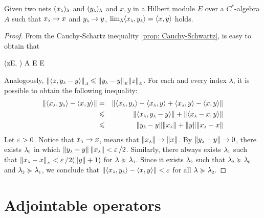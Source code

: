 \begin{lema}
\label{lema: lim <x_lambda,y_lambda> = <x,y>}
Given two nets $(\sub x\lambda)_\lambda$ and $(\sub y\lambda)_\lambda$ and $x,y$ in a Hilbert module $E$ over a $C^*$-algebra $A$ such that $\sub x\lambda \to x$ and $\sub y\lambda \to y$,  $\lim_\lambda \inner{\sub x\lambda}{\sub y\lambda} = \inner xy$ holds.
\begin{proof}
From the Cauchy-Schartz inequality \ref{prop: Cauchy-Schwartz}, is easy to obtain that
\begin{eqspaced*}{(z\in E, \lambda \in \LLambda)}
    A \overset{(\ref{eq: cauchy-schwarts})}\leqslant {}E E
\end{eqspaced*}
Analogously, $\sub{\|\inner z{\sub y\lambda-y}\|}A \leqslant \sub{\|\sub y\lambda-y\|}E \sub{\|z\|}E$. For each and every index $\lambda$, it is possible to obtain the following inequality:
\begin{eqnarray*}
    \|\inner{\sub x\lambda}{\sub y\lambda} - \inner xy\| &=& \|\inner{\sub x\lambda}{\sub y\lambda} - \inner{\sub x\lambda}y + \inner{\sub x\lambda}y- \inner xy\|  \\
    &\leqslant& \|\inner{\sub x\lambda}{\sub y\lambda-y}\| + \| \inner{\sub x\lambda-x}y\| \\
    &\leqslant& \|\sub y\lambda-y\| \|\sub x\lambda\| +\|y\|\|\sub x\lambda-x\| 
\end{eqnarray*}
Let $\operatorname{{\varepsilon}} > 0$. Notice that $\sub x\lambda \to x$, means that $\|\sub x\lambda\| \to \|x\|$. By $\|\sub y\lambda -y\|\to 0$,  there exists $\sub\lambda 0$ in which $\|\sub y\lambda - y\|\,\|\sub x\lambda\|  < \ep/2 $. Similarly, there always exists $\sub\lambda1$ such that $\sub{\|\sub x\lambda -x\|}E < \ep/2({\|y\|}+1)$ for $\lambda \succeq \sub\lambda1$. Since it exists $\sub\lambda2 $ such that $\sub\lambda2 \succeq \sub\lambda0$ and $\sub\lambda2 \succeq \sub\lambda1$, we conclude that $\|\inner{\sub x\lambda}{\sub y\lambda} - \inner xy\| < \ep$ for all $\lambda \succeq \sub\lambda2$.
\end{proof}
\end{lema}



\section{Adjointable operators}

